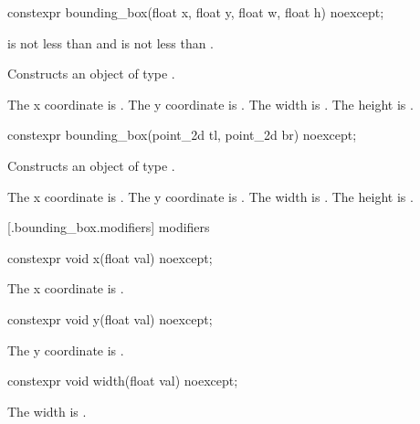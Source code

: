 %
\begin{itemdecl}
constexpr bounding_box(float x, float y, float w, float h) noexcept;
\end{itemdecl}
\begin{itemdescr}
\pnum
\requires
{} is not less than  and  is not less than .

\pnum
\effects
Constructs an object of type .

\pnum
The x coordinate is . The y coordinate is . The width is . The height is .
\end{itemdescr}

%
\begin{itemdecl}
constexpr bounding_box(point_2d tl, point_2d br) noexcept;
\end{itemdecl}
\begin{itemdescr}
\pnum
\effects
Constructs an object of type .

\pnum
The x coordinate is . The y coordinate is . The width is . The height is .
\end{itemdescr}

 [\iotwod.bounding_box.modifiers]{ modifiers}

%
\begin{itemdecl}
constexpr void x(float val) noexcept;
\end{itemdecl}

\begin{itemdescr}
\pnum
\effects
The x coordinate is .
\end{itemdescr}

%
\begin{itemdecl}
constexpr void y(float val) noexcept;
\end{itemdecl}
\begin{itemdescr}
\pnum
\effects
The y coordinate is .
\end{itemdescr}

%
\begin{itemdecl}
constexpr void width(float val) noexcept;
\end{itemdecl}
\begin{itemdescr}
\pnum
\effects
The width is .
\end{itemdescr}


